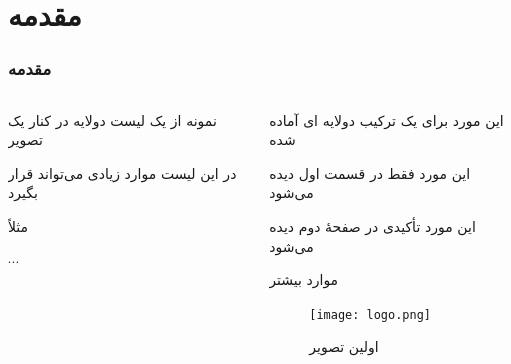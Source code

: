 \documentclass[xcolor=dvipsnames, professionalfonts, aspectratio=169, 11pt]{beamer}
\begin{document}
\section{مقدمه}
\begin{frame}
    \frametitle{مقدمه}

    \begin{columns}[onlytextwidth]
        \begin{column}{.4\textwidth}
            \begin{moredi}
                \item نمونه از یک لیست دولایه در کنار یک تصویر
                \begin{moredi}[<1>]
                    \item در این لیست موارد زیادی می‌تواند قرار بگیرد
                    \item مثلاً
                    \item $\cdots$

                \end{moredi}
            \end{moredi}
        \end{column}
        \begin{column}{.6\textwidth}
            \begin{moredi}
                \item این مورد برای یک ترکیب دولایه ای آماده شده
                \begin{moredi}
                    \item<1> این مورد فقط در قسمت اول دیده می‌شود
                    \item \alert<2>{این مورد تأکیدی در صفحهٔ دوم دیده می‌شود}
                    \item<1> موارد بیشتر

                \end{moredi}
            \end{moredi}
            \begin{figure}
                \vspace{-1em}
                \texttt{[image: logo.png]}
                \caption{اولین تصویر }
            \end{figure}
        \end{column}
    \end{columns}

\end{frame}
\end{document}
